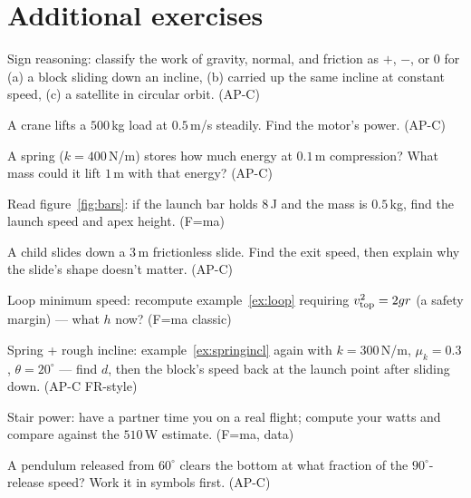 \section*{Additional exercises}

\begin{exercise}[easy]
Sign reasoning: classify the work of gravity, normal, and friction as
$+$, $-$, or $0$ for (a) a block sliding down an incline, (b) carried up
the same incline at constant speed, (c) a satellite in circular orbit.
(AP-C)
\end{exercise}
\begin{exercise}[easy]
A crane lifts a $500$\,kg load at $0.5$\,m/s steadily. Find the motor's
power. (AP-C)
\end{exercise}
\begin{exercise}[easy]
A spring ($k=400$\,N/m) stores how much energy at $0.1$\,m compression?
What mass could it lift $1$\,m with that energy? (AP-C)
\end{exercise}
\begin{exercise}[easy]
Read figure~\ref{fig:bars}: if the launch bar holds $8$\,J and the mass
is $0.5$\,kg, find the launch speed and apex height. (F=ma)
\end{exercise}
\begin{exercise}[easy]
A child slides down a $3$\,m frictionless slide. Find the exit speed,
then explain why the slide's shape doesn't matter. (AP-C)
\end{exercise}
\begin{exercise}[medium]
Loop minimum speed: recompute example~\ref{ex:loop} requiring
$v_{\rm top}^{2}=2gr$ (a safety margin) --- what $h$ now? (F=ma classic)
\end{exercise}
\begin{exercise}[medium]
Spring + rough incline: example~\ref{ex:springincl} again with
$k=300$\,N/m, $\mu_k=0.3$, $\theta=20^{\circ}$ --- find $d$, then the
block's speed back at the launch point after sliding down. (AP-C FR-style)
\end{exercise}
\begin{exercise}[medium]
Stair power: have a partner time you on a real flight; compute your watts
and compare against the $510$\,W estimate. (F=ma, data)
\end{exercise}
\begin{exercise}[medium]
A pendulum released from $60^{\circ}$ clears the bottom at what fraction
of the $90^{\circ}$-release speed? Work it in symbols first. (AP-C)
\end{exercise}
